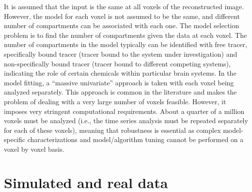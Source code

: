It is assumed that the input is the same at all voxels of the reconstructed
image. However, the model for each voxel is not assumed to be the same, and
different number of compartments can be associated with each one. The model
selection problem is to find the number of compartments given the data at
each voxel. The number of compartments in the model typically can be
identified with free tracer, specifically bound tracer (tracer bound to the
system under investigation) and non-specifically bound tracer (tracer bound
to different competing systems), indicating the role of certain chemicals
within particular brain systems. In the model fitting, a ``massive
univariate'' approach is taken with each voxel being analyzed separately.
This approach is common in the literature and makes the problem of dealing
with a very large number of voxels feasible. However, it imposes very
stringent computational requirements. About a quarter of a million voxels
must be analyzed (i.e., the time series analysis must be repeated separately
for each of these voxels), meaning that robustness is essential as complex
model-specific characterizations and model/algorithm tuning cannot be
performed on a voxel by voxel basis.

\section{Simulated and real \protect\pet data}
\label{sec:Simulated and real pet data}



